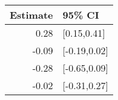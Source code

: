 \begin{tabular}{rl}
  \hline
Estimate & 95\% CI \\ 
  \hline
0.28 & [0.15,0.41] \\ 
  -0.09 & [-0.19,0.02] \\ 
  -0.28 & [-0.65,0.09] \\ 
  -0.02 & [-0.31,0.27] \\ 
   \hline
\end{tabular}

